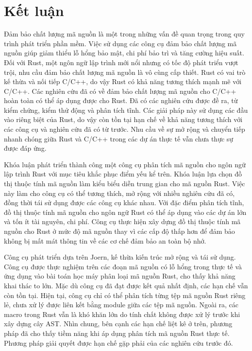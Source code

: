 \chapter*{Kết luận}

Đảm bảo chất lượng mã nguồn là một trong những vấn đề quan trọng trong quy trình phát triển phần mềm.
Việc sử dụng các công cụ đảm bảo chất lượng mã nguồn giúp giảm thiểu lỗ hổng bảo mật, chi phí bảo trì và tăng cường hiệu suất.
Đối với Rust, một ngôn ngữ lập trình mới nổi nhưng có tốc độ phát triển vượt trội, nhu cầu đảm bảo chất lượng mã nguồn là vô cùng cấp thiết.
Rust có vai trò kế thừa và nối tiếp C/C++, do vậy Rust có khả năng tương thích mạnh mẽ với C/C++.
Các nghiên cứu đã có về đảm bảo chất lượng mã nguồn cho C/C++ hoàn toàn có thể áp dụng được cho Rust.
Đã có các nghiên cứu được đề ra, từ kiểm chứng, kiểm thử động và phân tích tĩnh.
Các giải pháp này sử dụng các đầu vào riêng biệt của Rust, do vậy còn tồn tại hạn chế về khả năng tương thích với các công cụ và nghiên cứu đã có từ trước.
Nhu cầu về sự mở rộng và chuyển tiếp nhanh chóng giữa Rust và C/C++ trong các dự án thực tế vẫn chưa thực sự được đáp ứng.

Khóa luận phát triển thành công một công cụ phân tích mã nguồn cho ngôn ngữ lập trình Rust với mục tiêu khắc phục điểm yếu kể trên.
Khóa luận lựa chọn đồ thị thuộc tính mã nguồn làm kiểu biểu diễn trung gian cho mã nguồn Rust.
Việc này làm cho công cụ có thể tương thích, mở rộng với nhiều nghiên cứu đã có, đồng thời tái sử dụng được các công cụ khác nhau.
Với đặc điểm phân tích tĩnh, đồ thị thuộc tính mã nguồn cho ngôn ngữ Rust có thể áp dụng vào các dự án lớn và tốn ít tài nguyên, chi phí.
Công cụ thực hiện xây dựng đồ thị thuộc tính mã nguồn cho Rust ở mức độ mã nguồn thay vì các cấp độ thấp hơn để đảm bảo không bị mất mát thông tin về các cơ chế đảm bảo an toàn bộ nhớ.

Công cụ phát triển dựa trên Joern, kế thừa kiến trúc mở rộng và tái sử dụng.
Công cụ được thực nghiệm trên các đoạn mã nguồn có lỗ hổng trong thực tế và ứng dụng vào bài toán học máy phân loại mã nguồn Rust, cho thấy khả năng khai thác to lớn.
Mặc dù công cụ đã đạt được kết quả nhất định, các hạn chế vẫn còn tồn tại.
Hiện tại, công cụ chỉ có thể phân tích từng tệp mã nguồn Rust riêng lẻ, chưa xử lý được liên kết bằng module giữa các tệp mã nguồn.
Ngoài ra, các macro trong Rust vẫn là khó khăn lớn do tính chất không được xử lý trước khi xây dựng cây AST.
Nhìn chung, bên cạnh các hạn chế liệt kê ở trên, phương pháp đã cho thấy tiềm năng khi áp dụng phân tích mã nguồn Rust thực tế.
Phương pháp giải quyết được hạn chế gặp phải của các nghiên cứu trước đó.
